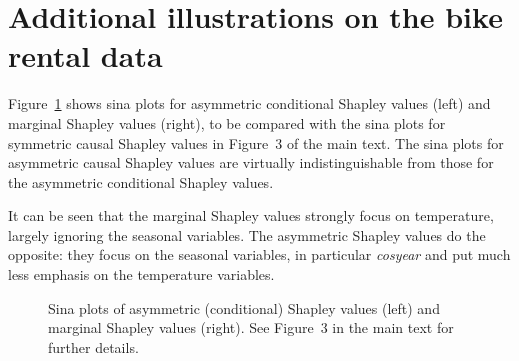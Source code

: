 \documentclass{article}
\begin{document}
\section{Additional illustrations on the bike rental data}

Figure~\ref{fig:sinaplots} shows sina plots for asymmetric conditional Shapley values (left) and marginal Shapley values (right), to be compared with the sina plots for symmetric causal Shapley values in Figure~3 of the main text. The sina plots for asymmetric causal Shapley values are virtually indistinguishable from those for the asymmetric conditional Shapley values.

It can be seen that the marginal Shapley values strongly focus on temperature, largely ignoring the seasonal variables. The asymmetric Shapley values do the opposite: they focus on the seasonal variables, in particular {\em cosyear} and put much less emphasis on the temperature variables.

\begin{figure}[t]
	\centering
	\begin{minipage}{.49\linewidth}
	\end{minipage}
	\begin{minipage}{.49\linewidth}
	\end{minipage}
	\caption{Sina plots of asymmetric (conditional) Shapley values (left) and marginal Shapley values (right). See Figure~3 in the main text for further details.}
	\label{fig:sinaplots}
\end{figure}



\end{document}
